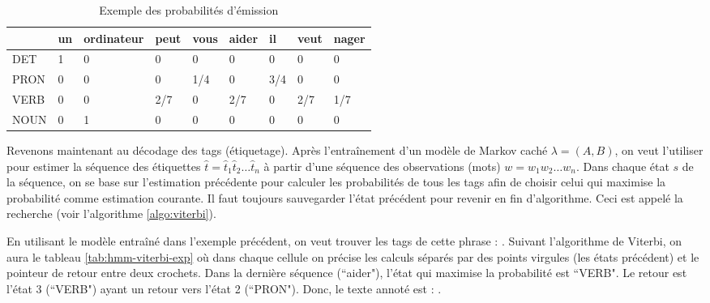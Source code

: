 \documentclass{KodeBook}
\begin{document}
\begin{table}[ht]
	\centering
\begin{tabular}{lllllllll}
	\cline{2-9}\noalign{\vskip\doublerulesep
		\vskip-\arrayrulewidth}\cline{2-9}
	     & un & ordinateur & peut & vous & aider & il & veut & nager \\
	\hline
	DET  &  1 &  0         &  0   &   0  &  0    & 0  & 0    & 0 \\
	PRON &  0 &  0         &  0   & 1/4  &  0    &3/4 & 0    & 0 \\
	VERB &  0 &  0         & 2/7  &   0  &  2/7  & 0  & 2/7  & 1/7 \\
	NOUN &  0 &  1         &  0   &   0  &  0    & 0  & 0    & 0 \\
	\hline\hline
\end{tabular}
\caption[Exemple des probabilités d'émission]{Exemple des probabilités d'émission \label{tab:hmm-emission}}
\end{table}

Revenons maintenant au décodage des tags (étiquetage). 
Après l'entraînement d'un modèle de Markov caché $\lambda = (A, B)$, on veut l'utiliser pour estimer la séquence des étiquettes $\hat{t} = \hat{t}_1 \hat{t}_2 \ldots \hat{t}_n$ à partir d'une séquence des observations (mots) $w = w_1 w_2 \ldots w_n$. 
Dans chaque état $s$ de la séquence, on se base sur l'estimation précédente pour calculer les probabilités de tous les tags afin de choisir celui qui maximise la probabilité comme estimation courante. 
Il faut toujours sauvegarder l'état précédent pour revenir en fin d'algorithme. 
Ceci est appelé la recherche  (voir l'algorithme \ref{algo:viterbi}).

En utilisant le modèle entraîné dans l'exemple précédent, on veut trouver les tags de cette phrase : . 
Suivant l'algorithme de Viterbi, on aura le tableau \ref{tab:hmm-viterbi-exp} où dans chaque cellule on précise les calculs séparés par des points virgules (les états précédent) et le pointeur de retour entre deux crochets. 
Dans la dernière séquence (``aider"), l'état qui maximise la probabilité est ``VERB". 
Le retour est l'état 3 (``VERB") ayant un retour vers l'état 2 (``PRON"). 
Donc, le texte annoté est : . 
\end{document}
